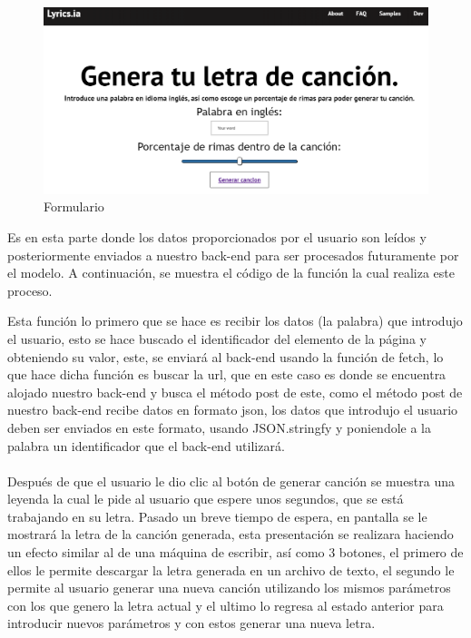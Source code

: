\documentclass[12pt, a4paper, titlepage]{report}
\begin{document}
\begin{figure}[H]
	\includegraphics[width=13.5cm]{./imagenes/Desarrollo/AplicacionWeb/Pformulario.png}
	\centering 
	\caption{Formulario}
\end{figure}
Es en esta parte donde los datos proporcionados por el usuario son leídos y posteriormente enviados a nuestro back-end para ser procesados futuramente por el modelo. A continuación, se muestra el código de la función la cual realiza este proceso.
\begin{center}
	
\end{center}
Esta función lo primero que se hace es recibir los datos (la palabra) que introdujo el usuario, esto se hace buscado el identificador del elemento de la página y obteniendo su valor, este, se enviará al back-end usando la función de fetch, lo que hace dicha función es buscar la url, que en este caso es donde se encuentra alojado nuestro back-end y busca el método post de este, como el método post de nuestro back-end recibe datos en formato json, los datos que introdujo el usuario deben ser enviados en este formato, usando JSON.stringfy y poniendole a la palabra un identificador que el back-end utilizará.\\\\
Después de que el usuario le dio clic al botón de generar canción se muestra una leyenda la cual le pide al usuario que espere unos segundos, que se está trabajando en su letra. Pasado un breve tiempo de espera, en pantalla se le mostrará la letra de la canción generada, esta presentación se realizara haciendo un efecto similar al de una máquina de escribir, así como 3 botones, el primero de ellos le permite descargar la letra generada en un archivo de texto, el segundo le permite al usuario generar una nueva canción utilizando los mismos parámetros con los que genero la letra actual y el ultimo lo regresa al estado anterior para introducir nuevos parámetros y con estos generar una nueva letra.
\end{document}
